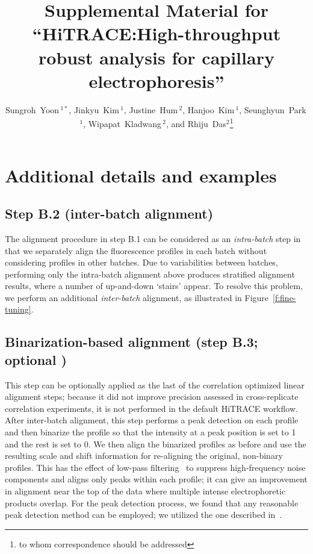 \documentclass[letter]{bioinfo}
\begin{document}

\title[High-throughput analysis for capillary electrophoresis]{Supplemental Material for ``HiTRACE:High-throughput robust analysis for capillary electrophoresis''}
\author[Yoon \textit{et~al}]{Sungroh~Yoon\,$^{1*}$, Jinkyu~Kim\,$^{1}$, Justine~Hum\,$^{2}$, Hanjoo~Kim\,$^{1}$, Seunghyun~Park\,$^{1}$, Wipapat~Kladwang\,$^{2}$, and Rhiju~Das$^2$\footnote{to whom correspondence should be addressed}}
\address{$^{1}$School of Electrical Engineering, Korea University, Seoul 136-713, Republic of Korea\\
$^{2}$Departments of Biochemistry and Physics, Stanford University, Stanford, CA 94305, USA}

\history{}


\maketitle

\section{Additional details and examples}
\subsection{Step B.2 (inter-batch alignment)}
The alignment procedure in step B.1 can be considered as an \emph{intra-batch} step in that we separately align the fluorescence profiles in each batch without considering profiles in other batches. Due to variabilities between batches, performing only the intra-batch alignment above produces stratified alignment results, where a number of up-and-down `stairs' appear. To resolve this problem, we perform an additional \emph{inter-batch} alignment, as illustrated in Figure~\ref{f:fine-tuning}.

\subsection{Binarization-based alignment (step B.3; optional )}
This step can be optionally applied as the last of the correlation optimized linear alignment steps; because it did not improve precision assessed in cross-replicate correlation experiments, it is not performed in the default HiTRACE workflow. After inter-batch alignment, this step performs a peak detection on each profile and then binarize the profile so that the intensity at a peak position is set to 1 and the rest is set to 0. We then align the binarized profiles as before and use the resulting scale and shift information for re-aligning the original, non-binary profiles. This has the effect of low-pass filtering~\citep{oppenheim09} to suppress high-frequency noise components and aligns only peaks within each profile; it can give an improvement in alignment near the top of the data where multiple intense electrophoretic products overlap. For the peak detection process, we found that any reasonable peak detection method can be employed; we utilized the one described in~\citet{kim09}.
\end{document}
